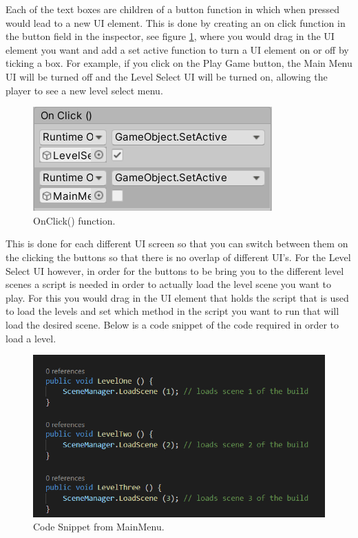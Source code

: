 Each of the text boxes are children of a button function in which when pressed would lead to a new UI element. This is done by creating an on click function in the button field in the inspector, see figure \ref{fig:OnClick()}, where you would drag in the UI element you want and add a set active function to turn a UI element on or off by ticking a box. For example, if you click on the Play Game button, the Main Menu UI will be turned off and the Level Select UI will be turned on, allowing the player to see a new level select menu.
\begin{figure}[h]
\centering
  \includegraphics[width= 0.8\linewidth]{Images/OnClick.PNG}
  \caption{OnClick() function.}
  \label{fig:OnClick()}
\end{figure}
This is done for each different UI screen so that you can switch between them on the clicking the buttons so that there is no overlap of different UI's. For the Level Select UI however, in order for the buttons to be bring you to the different level scenes a script is needed in order to actually load the level scene you want to play. For this you would drag in the UI element that holds the script that is used to load the levels and set which method in the script you want to run that will load the desired scene. Below is a code snippet of the code required in order to load a level.
\begin{figure}[h]
\centering
  \includegraphics[width= 0.8\linewidth]{Images/LevelSelectCode.PNG}
  \caption{Code Snippet from MainMenu.}
  \label{fig:Level}
\end{figure}

